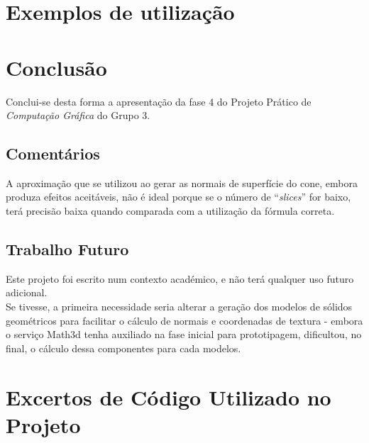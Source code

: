 \documentclass[11pt,a4paper]{report}%
\def\cg{\emph{Computação Gráfica}\xspace}
\begin{document}
\chapter{Exemplos de utilização} \label{chap:exemps} %

\chapter{Conclusão} \label{concl}

Conclui-se desta forma a apresentação da fase 4 do Projeto Prático de \cg do Grupo 3.

\section{Comentários}

A aproximação que se utilizou ao gerar as normais de superfície do cone, embora
produza efeitos aceitáveis, não é ideal porque se o número de ``\textit{slices}'' for baixo,
terá precisão baixa quando comparada com a utilização da fórmula correta.

\section{Trabalho Futuro}

Este projeto foi escrito num contexto académico, e não terá qualquer uso futuro adicional.\\

Se tivesse, a primeira necessidade seria alterar a geração dos modelos de sólidos geométricos
para facilitar o cálculo de normais e coordenadas de textura - embora o serviço Math3d tenha
auxiliado na fase inicial para prototipagem, dificultou, no final, o cálculo dessa componentes
para cada modelos.

\appendix %
\chapter{Excertos de Código Utilizado no Projeto}

\end{document}
